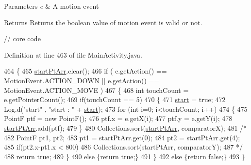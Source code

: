 \begin{DoxyParams}{Parameters}
{\em e} & A motion event \\
\hline
\end{DoxyParams}
\begin{DoxyReturn}{Returns}
Returns the boolean value of motion event is valid or not.
\end{DoxyReturn}

\begin{DoxyCode}
\textcolor{comment}{// core code}
\end{DoxyCode}
 

Definition at line 463 of file Main\+Activity.\+java.


\begin{DoxyCode}
464         \{
465             \hyperlink{classcom_1_1example_1_1multitouchsample_1_1_main_activity_1_1_my_view_a8e580a64440ed09158aa2bbc50ad4cf6}{startPtArr}.clear();
466             \textcolor{keywordflow}{if} ( e.getAction() == MotionEvent.ACTION\_DOWN || e.getAction() == MotionEvent.ACTION\_MOVE )
467             \{
468                 \textcolor{keywordtype}{int} touchCount = e.getPointerCount();       
469                 \textcolor{keywordflow}{if}(touchCount == 5)
470                 \{
471                     \hyperlink{classcom_1_1example_1_1multitouchsample_1_1_main_activity_1_1_my_view_a45f874e10d05217f17e21ebee2f636ea}{start} = \textcolor{keyword}{true};
472                     Log.d(\textcolor{stringliteral}{"start"} , \textcolor{stringliteral}{"start : "} + \hyperlink{classcom_1_1example_1_1multitouchsample_1_1_main_activity_1_1_my_view_a45f874e10d05217f17e21ebee2f636ea}{start});
473                     \textcolor{keywordflow}{for} (\textcolor{keywordtype}{int} i=0; i<touchCount; i++)
474                     \{
475                         PointF ptf = \textcolor{keyword}{new} PointF();
476                         ptf.x = e.getX(i);
477                         ptf.y = e.getY(i);
478                         \hyperlink{classcom_1_1example_1_1multitouchsample_1_1_main_activity_1_1_my_view_a8e580a64440ed09158aa2bbc50ad4cf6}{startPtArr}.add(ptf);
479                     \}
480                     Collections.sort(\hyperlink{classcom_1_1example_1_1multitouchsample_1_1_main_activity_1_1_my_view_a8e580a64440ed09158aa2bbc50ad4cf6}{startPtArr}, comparatorX);
481                     \textcolor{comment}{/*}
482 \textcolor{comment}{                    PointF pt1, pt2;}
483 \textcolor{comment}{                    pt1 = startPtArr.get(0);}
484 \textcolor{comment}{                    pt2 = startPtArr.get(4);}
485 \textcolor{comment}{                    if(pt2.x-pt1.x < 800)}
486 \textcolor{comment}{                        Collections.sort(startPtArr, comparatorY);}
487 \textcolor{comment}{                    */}
488                     \textcolor{keywordflow}{return} \textcolor{keyword}{true};
489                 \}
490                 \textcolor{keywordflow}{else} \{\textcolor{keywordflow}{return} \textcolor{keyword}{true};\}
491             \}
492             \textcolor{keywordflow}{else} \{\textcolor{keywordflow}{return} \textcolor{keyword}{false};\}
493         \}
\end{DoxyCode}


